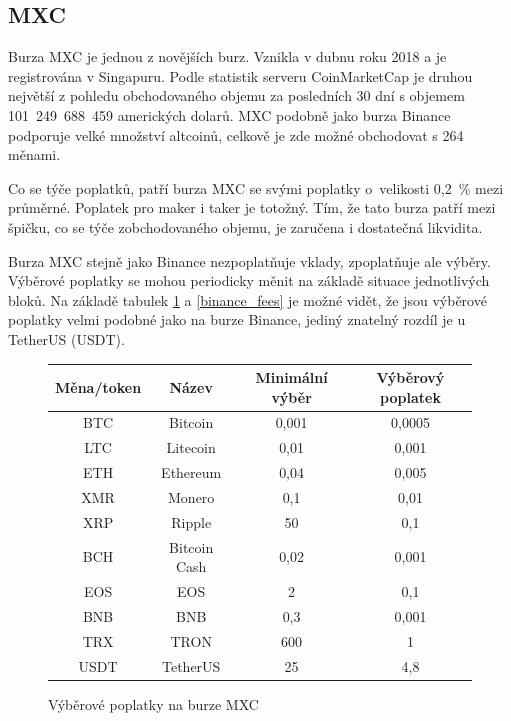 \documentclass[thesis=B,czech]{FITthesis}[2019/03/21]
\begin{document}
\subsection{MXC}
Burza MXC je jednou z novějších burz. Vznikla v dubnu roku 2018 a je registrována v Singapuru. Podle statistik serveru CoinMarketCap je druhou největší z pohledu obchodovaného objemu za posledních 30 dní s objemem 101~249~688~459 amerických dolarů. \cite{coinmarketcap} MXC podobně jako burza Binance podporuje velké množství altcoinů, celkově je zde možné obchodovat s 264 měnami. \cite{mxc_coins}

Co se týče poplatků, patří burza MXC se svými poplatky o~velikosti 0,2~\% mezi průměrné. Poplatek pro maker i taker je totožný. Tím, že tato burza patří mezi špičku, co se týče zobchodovaného objemu, je zaručena i dostatečná likvidita. \cite{cryptowisser_mxc} 

Burza MXC stejně jako Binance nezpoplatňuje vklady, zpoplatňuje ale výběry. Výběrové poplatky se mohou periodicky měnit na základě situace jednotlivých bloků. \cite{mxc_fees} Na základě tabulek \ref{mxc_fees} a \ref{binance_fees} je možné vidět, že jsou výběrové poplatky velmi podobné jako na burze Binance, jediný znatelný rozdíl je u TetherUS (USDT). \cite{cryptowisser_mxc}

\begin{figure}\centering
    \begin{center}
     \begin{tabular}{||c | c | c | c||} 
     \hline
     Měna/token & Název & Minimální výběr & Výběrový poplatek \\ [0.5ex] 
     \hline\hline
     BTC & Bitcoin & 0,001 & 0,0005 \\ 
     \hline
     LTC & Litecoin & 0,01 & 0,001 \\
     \hline
     ETH & Ethereum & 0,04 & 0,005 \\
     \hline
     XMR & Monero & 0,1 & 0,01 \\
     \hline
     XRP & Ripple & 50 & 0,1 \\
     \hline
     BCH & Bitcoin Cash & 0,02 & 0,001 \\
     \hline
     EOS & EOS & 2 & 0,1 \\
     \hline
     BNB & BNB & 0,3 & 0,001 \\
     \hline
     TRX & TRON & 600 & 1 \\
     \hline
     USDT & TetherUS & 25 & 4,8 \\ [1ex] 
     \hline
    \end{tabular}
    \end{center}
    \caption{Výběrové poplatky na burze MXC \cite{mxc_fees}}
    \label{mxc_fees}
\end{figure}
\end{document}

